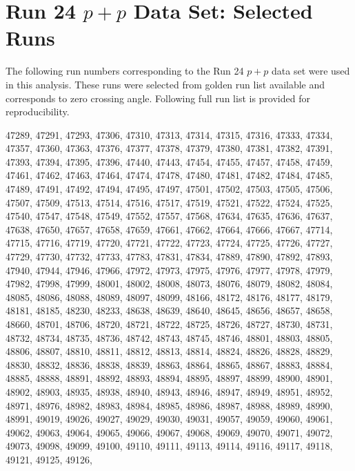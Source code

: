 
\chapter{Run 24 \texorpdfstring{$p+p$}{pp} Data Set: Selected Runs}
\label{app:runs}

The following run numbers corresponding to the Run 24 $p+p$ data set were used in this analysis. These runs were selected from golden run list available and corresponds to zero crossing angle. Following full run list is provided for reproducibility.

\begin{small}
\begin{flushleft}

47289,
47291,
47293,
47306,
47310,
47313,
47314,
47315,
47316,
47333,
47334,
47357,
47360,
47363,
47376,
47377,
47378,
47379,
47380,
47381,
47382,
47391,
47393,
47394,
47395,
47396,
47440,
47443,
47454,
47455,
47457,
47458,
47459,
47461,
47462,
47463,
47464,
47474,
47478,
47480,
47481,
47482,
47484,
47485,
47489,
47491,
47492,
47494,
47495,
47497,
47501,
47502,
47503,
47505,
47506,
47507,
47509,
47513,
47514,
47516,
47517,
47519,
47521,
47522,
47524,
47525,
47540,
47547,
47548,
47549,
47552,
47557,
47568,
47634,
47635,
47636,
47637,
47638,
47650,
47657,
47658,
47659,
47661,
47662,
47664,
47666,
47667,
47714,
47715,
47716,
47719,
47720,
47721,
47722,
47723,
47724,
47725,
47726,
47727,
47729,
47730,
47732,
47733,
47783,
47831,
47834,
47889,
47890,
47892,
47893,
47940,
47944,
47946,
47966,
47972,
47973,
47975,
47976,
47977,
47978,
47979,
47982,
47998,
47999,
48001,
48002,
48008,
48073,
48076,
48079,
48082,
48084,
48085,
48086,
48088,
48089,
48097,
48099,
48166,
48172,
48176,
48177,
48179,
48181,
48185,
48230,
48233,
48638,
48639,
48640,
48645,
48656,
48657,
48658,
48660,
48701,
48706,
48720,
48721,
48722,
48725,
48726,
48727,
48730,
48731,
48732,
48734,
48735,
48736,
48742,
48743,
48745,
48746,
48801,
48803,
48805,
48806,
48807,
48810,
48811,
48812,
48813,
48814,
48824,
48826,
48828,
48829,
48830,
48832,
48836,
48838,
48839,
48863,
48864,
48865,
48867,
48883,
48884,
48885,
48888,
48891,
48892,
48893,
48894,
48895,
48897,
48899,
48900,
48901,
48902,
48903,
48935,
48938,
48940,
48943,
48946,
48947,
48949,
48951,
48952,
48971,
48976,
48982,
48983,
48984,
48985,
48986,
48987,
48988,
48989,
48990,
48991,
49019,
49026,
49027,
49029,
49030,
49031,
49057,
49059,
49060,
49061,
49062,
49063,
49064,
49065,
49066,
49067,
49068,
49069,
49070,
49071,
49072,
49073,
49098,
49099,
49100,
49110,
49111,
49113,
49114,
49116,
49117,
49118,
49121,
49125,
49126,

\end{flushleft}
\end{small}
